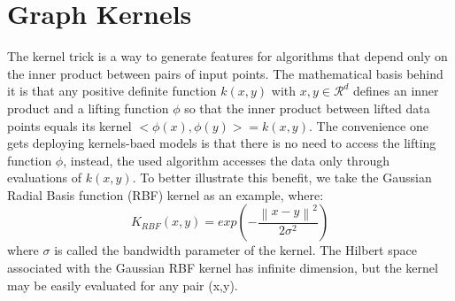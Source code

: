 \section{Graph Kernels}
The kernel trick is a way to generate features for algorithms that depend only on the inner product between pairs of input points. The mathematical basis behind it is that any positive definite function $k(x,y)$ with $x,y \in \mathcal{R}^d$ defines an inner product and a lifting function $\phi$ so that the inner product between lifted data points equals its kernel $<\phi(x),\phi(y)>=k(x,y)$. The convenience one gets deploying kernels-baed models is that there is no need to access the lifting function $\phi$, instead, the used algorithm accesses the data only through evaluations of $k(x,y)$. To better illustrate this benefit, we take the Gaussian Radial Basis function (RBF) kernel as an example, where:
\begin{equation}
    K_{RBF}(x,y)=exp(-\frac{\left \| x-y\right\|^2}{2\sigma^2})
\end{equation}
where $\sigma$ is called the bandwidth parameter of the kernel. The Hilbert space associated with the Gaussian RBF kernel has infinite dimension, but the kernel may be easily evaluated for any pair (x,y). 

